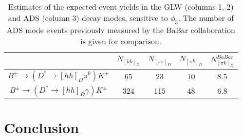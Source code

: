 \documentclass[oneside,12pt]{article}
\begin{document}
\begin{table}[]
  \centering
  \small
  \begin{tabular}{| c | c | c | c | c |}
    \hline
    & $N_{[kk]_{D}}$ & $N_{[\pi\pi]_{D}}$ & $N_{[\pi k]_D}$ & $N_{[\pi k]_D}^{BaBar}$ \\ \hline
    $B^{\pm}\rightarrow(D^*\rightarrow [hh]_D\pi^0)K^{\pm}$ & 65 & 23  & 10 & 8.5 \\ \hline
    $B^{\pm}\rightarrow(D^*\rightarrow [hh]_D\gamma)K^{\pm}$ & 324 & 115 & 48 & 6.8 \\ \hline
  \end{tabular}
	\caption{\small{Estimates of the expected event yields in the GLW (columns 1,
2) and ADS (column 3) decay modes, sensitive to $\phi_3$. The number of ADS
mode events previously measured by the BaBar collaboration is given for
comparison.}} \label{table:extrapolatedYields}
\end{table}


\section{Conclusion} \label{sec:conclusion}
\end{document}
